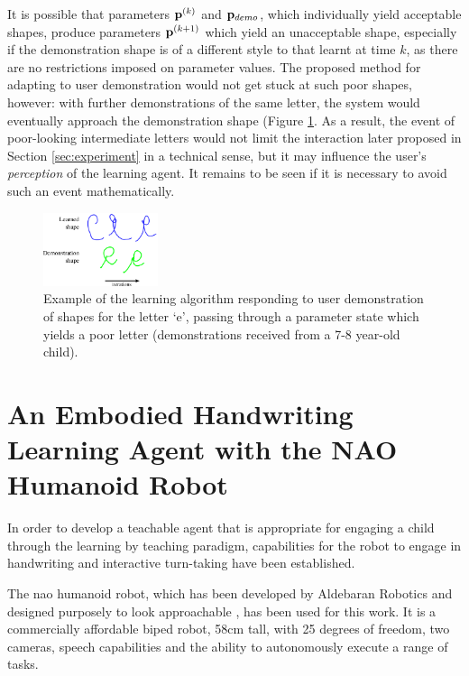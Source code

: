 \documentclass{sig-alternate}
\begin{document}
It is possible that parameters ${\bf p}^{(k)}$ and ${\bf p}_{demo}$, which
individually yield acceptable shapes, produce parameters ${\bf p}^{(k+1)}$
which yield an unacceptable shape, especially if the demonstration shape is of a different style to that learnt at time $k$, as there are no restrictions imposed on parameter values. The proposed method for adapting to user
demonstration would not get stuck at such poor shapes, however: with further
demonstrations of the same letter, the system would eventually approach the
demonstration shape (Figure \ref{fig:eDemo}. As a result, the event of poor-looking 
intermediate letters
would not limit the interaction later proposed in Section \ref{sec:experiment}
in a technical sense, but it may influence the user's \emph{perception} of the learning
agent. It remains to be seen if it is necessary to avoid such an event
mathematically.

\begin{figure}[thpb]
    \centering
    \includegraphics[width=0.3\textwidth]{figures/learningEdemo}
    \caption{\label{fig:eDemo}Example of the learning algorithm
    responding to user demonstration of shapes for the letter `e', passing through a parameter state which yields a poor letter (demonstrations received from a 7-8 year-old child).}
\end{figure}



\section{An Embodied Handwriting Learning Agent with the NAO Humanoid Robot}
\label{sec:robotWriting}

In order to develop a teachable agent that is appropriate for engaging a child
through the learning by teaching paradigm, 
capabilities for the robot to engage in handwriting and interactive turn-taking have been established.

The {\sc nao} humanoid robot, which has been developed by Aldebaran Robotics and
designed purposely to look approachable \cite{Gouaillier2008}, has been used for
this work. It is a commercially affordable biped robot, 58cm tall, with 25
degrees of freedom, two cameras, speech capabilities and the ability to
autonomously execute a range of tasks.
\end{document}
